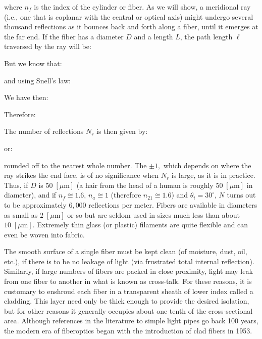 	where $n_{f}$ is the index of the cylinder or fiber. As we will show, a meridional ray (i.e., one that is coplanar with the central or optical axis) might undergo several thousand reflections as it bounces back and forth along a fiber, until it emerges at the far end. If the fiber has a diameter $D$ and a length $L$, the path length $\ell$ traversed by the ray will be:
	
	But we know that:
	
	and using Snell's law:
	
	We have then:
	
	Therefore:
	
	The number of reflections $N_{r}$ is then given by:
	
	or:
	
	rounded off to the nearest whole number. The $\pm 1,$ which depends on where the ray strikes the end face, is of no significance when $N_{r}$ is large, as it is in practice. Thus, if $D$ is $50\; [\mu \text{m}]$ (a hair from the head of a human is roughly $50\;[\mu \text{m}]$ in diameter), and if $n_{f}\cong 1.6$, $n_a\cong 1$ (therefore $n_{21}\cong 1.6$) and $\theta_{i}=30^{\circ}$, $N$ turns out to be approximately $6,000$ reflections per meter. Fibers are available in diameters as small as $2\; [\mu \text{m}]$ or so but are seldom used in sizes much less than about $10\; [\mu \text{m}]$. Extremely thin glass (or plastic) filaments are quite flexible and can even be woven into fabric.

	The smooth surface of a single fiber must be kept clean (of moisture, dust, oil, etc.), if there is to be no leakage of light (via frustrated total internal reflection). Similarly, if large numbers of fibers are packed in close proximity, light may leak from one fiber to another in what is known as cross-talk. For these reasons, it is customary to enshroud each fiber in a transparent sheath of lower index called a cladding. This layer need only be thick enough to provide the desired isolation, but for other reasons it generally occupies about one tenth of the cross-sectional area. Although references in the literature to simple light pipes go back 100 years, the modern era of fiberoptics began with the introduction of clad fibers in 1953.
	

